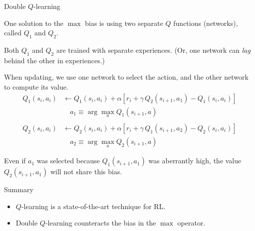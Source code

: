 \documentclass[9pt]{beamer}
\newcommand\pskip{\pause\bigskip}
\newcommand\lspace{\addtolength{\itemsep}{0.5\baselineskip}}
\begin{document}
\begin{frame}{Double $Q$-learning}

One solution to the $\max$ bias is using two separate $Q$ functions (networks), called $Q_1$ and $Q_2$.

\bigskip
Both $Q_1$ and $Q_2$ are trained with separate experiences. (Or, one network can \emph{lag} behind the other in experiences.)

\pskip
When updating, we use one network to select the action, and the other network to compute its value.
\begin{align*}
	Q_1(s_i,a_i) &\leftarrow Q_1(s_i,a_i) + \alpha\left[ r_i + \gamma\, Q_2(s_{i+1},a_1) - Q_1(s_i,a_i) \right] \\
	& \quad a_1 \equiv \arg\max_a Q_1(s_{i+1},a) \\ \\
	Q_2(s_i,a_i) &\leftarrow Q_2(s_i,a_i) + \alpha\left[ r_i + \gamma\, Q_1(s_{i+1},a_2) - Q_2(s_i,a_i) \right] \\
	& \quad a_2 \equiv \arg\max_a Q_2(s_{i+1},a)
\end{align*}

\pskip
Even if $a_1$ was selected because $Q_1(s_{i+1},a_1)$ was aberrantly high, the value $Q_2(s_{i+1},a_1)$ will not share this bias.
	
\end{frame}

%
%


\begin{frame}{Summary}

\begin{itemize}\lspace
	\item $Q$-learning is a state-of-the-art technique for RL.
	\item Double $Q$-learning counteracts the bias in the $\max$ operator.
\end{itemize}
	
\end{frame}
\end{document}
